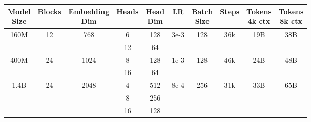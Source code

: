 \begin{tabular}{ccccc|ccccc}
    \toprule
    \thead{Model\\ Size} & Blocks & \thead{Embedding \\ Dim}  & Heads   & \thead{Head \\ Dim}            & LR& \thead{Batch\\ Size}         & Steps                & \thead{Tokens \\ 4k ctx}                & \thead{Tokens \\ 8k ctx}                 \\
    \midrule
    \multirow{2}{*}{160M} & \multirow{2}{*}{12} & \multirow{2}{*}{768}  & 6  & 128 & \multirow{2}{*}{3e-3} & \multirow{2}{*}{128} & \multirow{2}{*}{36k} & \multirow{2}{*}{19B} & \multirow{2}{*}{38B} \\
                          &                     &                       & 12 & 64  &                       &                      &                      &                      &                      \\
    \midrule
    \multirow{2}{*}{400M} & \multirow{2}{*}{24} & \multirow{2}{*}{1024} & 8  & 128 & \multirow{2}{*}{1e-3} & \multirow{2}{*}{128} & \multirow{2}{*}{46k} & \multirow{2}{*}{24B} & \multirow{2}{*}{48B} \\
                          &                     &                       & 16 & 64  &                       &                      &                      &                      &                      \\
    \midrule
    \multirow{3}{*}{1.4B} & \multirow{3}{*}{24} & \multirow{3}{*}{2048} & 4  & 512 & \multirow{3}{*}{8e-4} & \multirow{3}{*}{256} & \multirow{3}{*}{31k} & \multirow{3}{*}{33B} & \multirow{3}{*}{65B} \\
                          &                     &                       & 8  & 256 &                       &                      &                      &                      &                      \\
                          &                     &                       & 16 & 128 &                       &                      &                      &                      &                      \\
    \bottomrule
\end{tabular}
